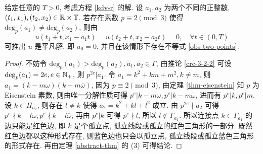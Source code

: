 \begin{theorem}\label{thm-use-prime}
给定任意的 $T>0$, 考虑方程 \eqref{kdv-r} 的解. 设 $a_1,a_2$ 为两个不同的正整数, $(t_1,x_1),(t_2,x_2)\in \mathbb{R}\times \mathbb{T}$. 若存在素数 $p\equiv 2\pmod{3}$ 使得 $\mathrm{deg}_p(a_1)\neq \mathrm{deg}_p(a_2)$, 则由
\begin{equation*}
    u(t_1+t,x_1-a_1t)=u(t_2+t,x_2-a_2t)=0,\quad \forall t\in (0,T)
\end{equation*}
可推出 $u$ 是平凡解, 即 $u_0=0$, 并且在该情形下存在不等式 \eqref{obs-two-points}.
\end{theorem}
\begin{proof}
不妨令 $\mathrm{deg}_p(a_1)>\mathrm{deg}_p(a_2),a_1,a_2\in \Gamma$, 由推论 \ref{crc-3-2-2} 可设 $\mathrm{deg}_p(a_1)=2e,e\in\mathbb{N}_{+}$, 则 $p^{2e}|a_1$. 令 $a_1=k^2+km+m^2,k\neq m$, 则 $a_1=(k-m\omega)(k-m\overline{\omega})$, 因为 $p\equiv 2\pmod{3}$, 由定理 \ref{thm-eisenstein} 知 $p$ 为 Eisenstein 素数, 则由唯一分解性质可得 $p^e | k-m\omega,p^e|k-m\overline{\omega}$, 进而有 $p^e|k, p^e|m$. 设 $k\in \Pi_{a_2}$, 则存在 $l\neq k$ 使得 $a_2=k^2+kl+l^2$ 成立. 由 $p^{2e}\nmid a_2$ 可得 $p^e\nmid k-l\omega,p^e\nmid k-l\overline{\omega}$, 再由 $p^e|k$ 可得 $p^e\nmid l$, 所以 $l\notin \Gamma_{a_1}$. 所以连接点 $k\in \Gamma_{a_1}$ 的边只能是红色边, 即 $k$ 是个孤立点, 孤立线段或孤立的红色三角形的一部分. 既然红色边都以这种形式存在, 则蓝色边也只会以孤立点, 孤立线段或孤立蓝色三角形的形式存在. 再由定理 \ref{abstract-thm} 的 (3) 可得结论. 
\end{proof}

